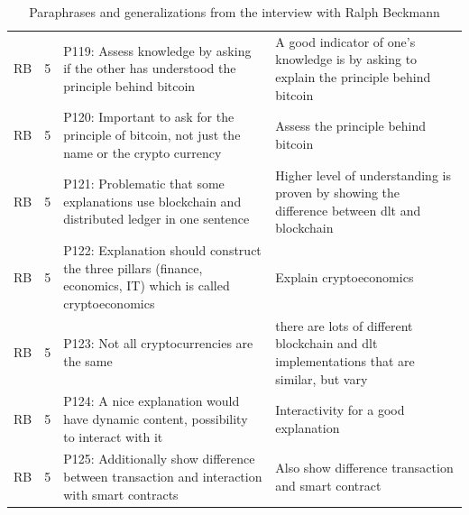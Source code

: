 \begin{table}[H]
\begin{tabularx}{\textwidth}{ll|X|p{4.5cm}}
	RB & 5 & P119: Assess knowledge by asking if the other has understood the principle behind bitcoin & A good indicator of one's knowledge is by asking to explain the principle behind bitcoin   \\  
	RB & 5 & P120: Important to ask for the principle of bitcoin, not just the name or the crypto currency & Assess the principle behind bitcoin   \\  
	RB & 5 & P121: Problematic that some explanations use blockchain and distributed ledger in one sentence & Higher level of understanding is proven by showing the difference between dlt and blockchain   \\  
	RB & 5 & P122: Explanation should construct the three pillars (finance, economics, IT) which is called cryptoeconomics & Explain cryptoeconomics   \\  
	RB & 5 & P123: Not all cryptocurrencies are the same & there are lots of different blockchain and dlt implementations that are similar, but vary   \\  
	RB & 5 & P124: A nice explanation would have dynamic content, possibility to interact with it & Interactivity for a good explanation   \\  
	RB & 5 & P125: Additionally show difference between transaction and interaction with smart contracts & Also show difference transaction and smart contract   \\  
    \end{tabularx}
    \caption{Paraphrases and generalizations from the interview with Ralph Beckmann}
    \label{tab:my_label4}
\end{table}

